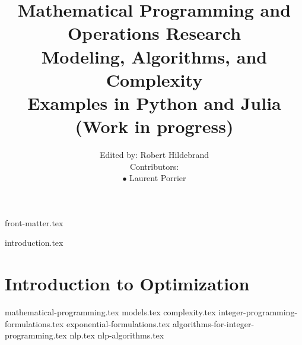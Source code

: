 \documentclass[letter,11pt]{book}
\title{ \textbf{Mathematical Programming and\\ Operations Research}\\ Modeling, Algorithms, and Complexity\\
 Examples in Python and Julia\\
 (Work in progress)}
\author{Edited by: Robert Hildebrand\\
 Contributors:\hspace{10cm} \\
 $\bullet$ Laurent Porrier \\
  }
\begin{document}
{front-matter.tex}
\tableofcontents

{introduction.tex}

\part{Introduction to Optimization}
{mathematical-programming.tex}
{models.tex}
{complexity.tex}
{integer-programming-formulations.tex}
{exponential-formulations.tex}
{algorithms-for-integer-programming.tex}
{nlp.tex}
{nlp-algorithms.tex}

\ifx\footfullcite\undefined  %
  
  
\else                        %
  \printbibliography
\fi
\end{document}
